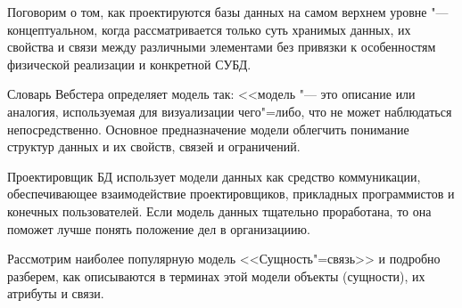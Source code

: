 Поговорим о том, как проектируются базы данных на самом верхнем
уровне "--- концептуальном, когда рассматривается только суть хранимых данных, их
свойства и связи между различными элементами без привязки к особенностям
физической реализации и конкретной СУБД.

Словарь Вебстера определяет модель так: <<модель "--- это
описание или аналогия, используемая для визуализации чего"=либо, что не может
наблюдаться непосредственно. Основное предназначение модели облегчить понимание
структур данных и их свойств, связей и ограничений.

Проектировщик БД использует модели данных как средство коммуникации, обеспечивающее
взаимодействие проектировщиков, прикладных программистов и конечных
пользователей. Если модель данных тщательно проработана, то она поможет лучше
понять положение дел в организациию.

Рассмотрим наиболее популярную модель <<Сущность"=связь>> и подробно разберем, как описываются в терминах этой
модели объекты (сущности), их атрибуты и связи\cite{4}.